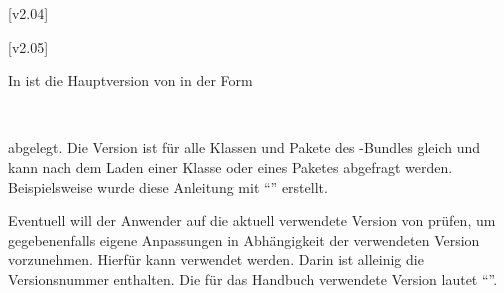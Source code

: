 \begin{Declaration}
  {}
  [v2.04]
\begin{Declaration}
  {}
  [v2.05]
\printdeclarationlist

In  ist die Hauptversion von \TUDScript in der Form
\begin{quoting}
~~
\end{quoting}
abgelegt. Die Version ist für alle Klassen und Pakete des \TUDScript-Bundles
gleich und kann nach dem Laden einer Klasse oder eines Paketes abgefragt 
werden. Beispielsweise wurde diese Anleitung mit \enquote{\TUDScriptVersion{}} 
erstellt.

Eventuell will der Anwender auf die aktuell verwendete Version von \TUDScript 
prüfen, um gegebenenfalls eigene Anpassungen in Abhängigkeit der verwendeten 
Version vorzunehmen. Hierfür kann  verwendet 
werden. Darin ist alleinig die Versionsnummer enthalten. Die für das Handbuch 
verwendete Version lautet \enquote{\TUDScriptVersionNumber}.
\end{Declaration}
\end{Declaration}
